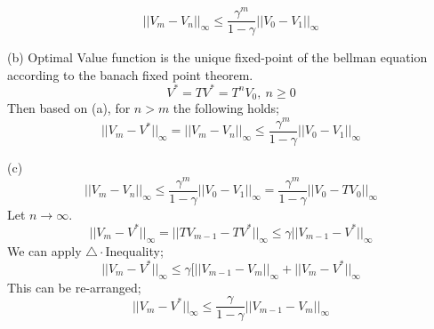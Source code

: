 \documentclass{article}
\begin{document}
\begin{tcolorbox}[colback=blue!5!white,colframe=blue!75!black,title=Question 6]
\begin{enumerate}
\begin{equation}
            ||V_m - V_n||_\infty \leq \frac{\gamma^m}{1 - \gamma} || V_0 - V_1||_\infty
        \end{equation}
    \end{enumerate}
    \begin{enumerate}(b)
        Optimal Value function is the unique fixed-point of the bellman equation according to the banach fixed point theorem.
        \begin{equation}
            V^* = T V^* = T^n V_0, \ n \geq 0 
        \end{equation}
    Then based on (a), for $n > m$ the following holds;
    \begin{equation}
            ||V_m - V^*||_\infty = ||V_m - V_n||_\infty \leq \frac{\gamma^m}{1 - \gamma} || V_0 - V_1||_\infty
        \end{equation}
    \end{enumerate}
    \begin{enumerate}(c)
        \begin{equation}
            || V_m - V_n ||_\infty \leq \frac{\gamma^m}{1 - \gamma} || V_0 - V_1||_\infty = \frac{\gamma^m}{1 - \gamma} || V_0 - T V_0||_\infty
        \end{equation}
        Let $n \rightarrow \infty$.
        \begin{equation}
            || V_m - V^* ||_\infty = || T V_{m-1} - T V^* ||_\infty \leq \gamma || V_{m-1} - V^* ||_\infty
        \end{equation}
        We can apply $\triangle\cdot$Inequality;
        \begin{equation}
                ||V_m - V^*||_\infty \leq \gamma [ || V_{m-1} - V_m ||_\infty + || V_m - V^* ||_\infty
        \end{equation}
        This can be re-arranged;
        \begin{equation}
            || V_m - V^* ||_\infty \leq \frac{\gamma}{1 - \gamma} || V_{m-1} - V_m ||_\infty
        \end{equation}
    \end{enumerate}
\end{tcolorbox}
\end{document}
